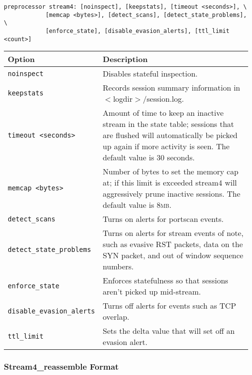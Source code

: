 \documentclass[english]{report}
\begin{document}
\begin{verbatim}
preprocessor stream4: [noinspect], [keepstats], [timeout <seconds>], \
            [memcap <bytes>], [detect_scans], [detect_state_problems], \
            [enforce_state], [disable_evasion_alerts], [ttl_limit <count>]
\end{verbatim}
\begin{tabular}{| l | p{5in} |}
\hline
\textbf{Option} & \textbf{Description}\\
\hline 
\hline 
\texttt{noinspect} & Disables stateful inspection.\\
\hline
\texttt{keepstats} & Records session summary information in $<$logdir$>$/session.log.\\
\hline
\texttt{timeout~<seconds>} & Amount of time to keep an inactive stream in
the state table; sessions that are flushed will automatically be picked
up again if more activity is seen. The default value is 30 seconds.\\
\hline
\texttt{memcap~<bytes>} & Number of bytes to set the memory cap at; if this
limit is exceeded stream4 will aggressively prune inactive sessions.
The default value is 8\textsc{mb}.\\
\hline
\texttt{detect\_scans} & Turns on alerts for portscan events.\\
\hline
\texttt{detect\_state\_problems} & Turns on alerts for stream events of note,
such as evasive RST packets, data on the SYN packet, and out of window
sequence numbers.\\
\hline
\texttt{enforce\_state} & Enforces statefulness so that sessions aren't picked up mid-stream.\\
\hline
\texttt{disable\_evasion\_alerts} & Turns off alerts for events such as TCP
overlap.\\
\hline
\texttt{ttl\_limit} & Sets the delta value that will set off an evasion alert.\\
\hline
\end{tabular}

\subsubsection{Stream4\_reassemble Format}
\end{document}
